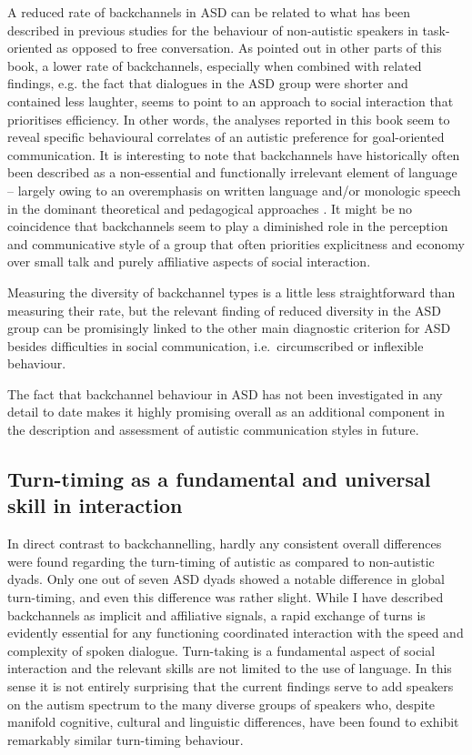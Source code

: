 A reduced rate of backchannels in ASD can be related to what has been described in previous studies for the behaviour of non-autistic speakers in task-oriented as opposed to free conversation. As pointed out in other parts of this book, a lower rate of backchannels, especially when combined with related findings, e.g. the fact that dialogues in the ASD group were shorter and contained less laughter, seems to point to an approach to social interaction that prioritises efficiency. In other words, the analyses reported in this book seem to reveal specific behavioural correlates of an autistic preference for goal-oriented communication. It is interesting to note that backchannels have historically often been described as a non-essential and functionally irrelevant element of language -- largely owing to an overemphasis on written language and/or monologic speech in the dominant theoretical and pedagogical approaches \citep{linellWrittenLanguageBias2004,schegloffDiscourseInteractionalAchievement1982,oconnellHistoryResearchFilled2004}. It might be no coincidence that backchannels seem to play a diminished role in the perception and communicative style of a group that often priorities explicitness and economy over small talk and purely affiliative aspects of social interaction.

Measuring the diversity of backchannel types is a little less straightforward than measuring their rate, but the relevant finding of reduced diversity in the ASD group can be promisingly linked to the other main diagnostic criterion for ASD besides difficulties in social communication, i.e.~circumscribed or inflexible behaviour.

The fact that backchannel behaviour in ASD has not been investigated in any detail to date makes it highly promising overall as an additional component in the description and assessment of autistic communication styles in future.

\subsection{Turn-timing as a fundamental and universal skill in interaction}\label{Conclusion_discussion_turns}

In direct contrast to backchannelling, hardly any consistent overall differences were found regarding the turn-timing of autistic as compared to non-autistic dyads. Only one out of seven ASD dyads showed a notable difference in global turn-timing, and even this difference was rather slight. While I have described backchannels as implicit and affiliative signals, a rapid exchange of turns is evidently essential for any functioning coordinated interaction with the speed  and complexity of spoken dialogue. Turn-taking is a fundamental aspect of social interaction and the relevant skills are not limited to the use of language. In this sense it is not entirely surprising that the current findings serve to add speakers on the autism spectrum to the many diverse groups of speakers who, despite manifold cognitive, cultural and linguistic differences, have been found to exhibit remarkably similar turn-timing behaviour.

